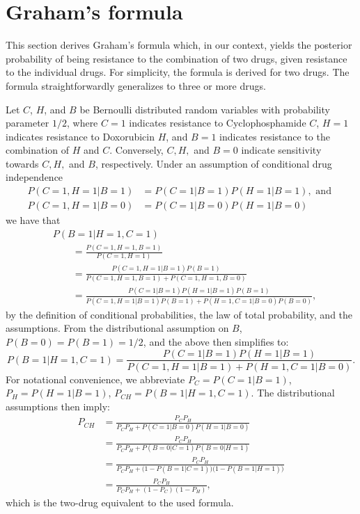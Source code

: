 \documentclass{article}
\begin{document}




\clearpage



\section{Graham's formula}
\label{sec:graham}
This section derives Graham's formula which, in our context, yields the posterior probability of being resistance to the combination of two drugs, given resistance to the individual drugs.
For simplicity, the formula is derived for two drugs.
The formula straightforwardly generalizes to three or more drugs.

Let $C$, $H$, and $B$ be Bernoulli distributed random variables with probability parameter $1/2$, where
$C = 1$ indicates resistance to Cyclophosphamide $C$,
$H = 1$ indicates resistance to Doxorubicin $H$, and
$B = 1$ indicates resistance to the combination of $H$ and $C$.
Conversely, $C,H,$ and $B = 0$ indicate sensitivity towards $C,H,$ and $B$, respectively.
Under an assumption of conditional drug independence
\begin{align*}
  P(C=1, H=1| B=1) &= P(C=1 | B=1) P(H=1 | B=1), \text{ and } \\
  P(C=1, H=1| B=0) &= P(C=1 | B=0) P(H=1 | B=0)
\end{align*}
we have that
\begin{align*}
  &P(B=1 | H=1, C=1)
  \\&\qquad
   = \frac{P(C=1, H=1, B=1)}
          {P(C=1, H=1)}
  \\&\qquad
   = \frac{P(C=1, H=1 | B=1) P(B=1)}
          {P(C=1, H=1, B=1) + P(C=1, H=1, B=0)}
  \\&\qquad
   = \frac{P(C=1 | B=1) P(H=1 | B=1) P(B=1)}
          {P(C=1, H=1 | B=1) P(B=1) + P(H=1, C=1| B=0) P(B=0)},
\end{align*}
by the definition of conditional probabilities, the law of total probability, and the assumptions.
From the distributional assumption on $B$, $P(B=0) = P(B=1) = 1/2$, and the above then simplifies to:
\begin{equation*}
  P(B=1 | H=1, C=1)
   = \frac{P(C=1 | B=1) P(H=1 | B=1)}
          {P(C=1, H=1 | B=1) + P(H=1, C=1 | B=0)}.
\end{equation*}
For notational convenience, we abbreviate
$P_C = P(C=1 | B=1)$,
$P_H = P(H=1 | B=1)$,
$P_{CH} = P(B=1 | H=1, C=1)$.
The distributional assumptions then imply:
\begin{align*}
  P_{CH}
  &= \frac{P_C P_H}
          {P_C P_H + P(C=1 | B=0) P(H=1 | B=0)}
  \\
  &= \frac{P_C P_H}
          {P_C P_H + P(B=0 | C=1) P(B=0 | H=1)}
  \\
  &= \frac{P_C P_H}
          {P_C P_H + \bigl(1 - P(B=1 | C=1)\bigr)\bigl(1 - P(B=1 | H=1)\bigr)}
  \\
  &= \frac{P_C P_H}
          {P_C P_H + (1 - P_C)(1 - P_H)},
\end{align*}
which is the two-drug equivalent to the used formula.
\end{document}
